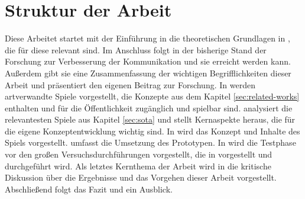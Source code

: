 \section{Struktur der Arbeit}
Diese Arbeitet startet mit der Einführung in die theoretischen Grundlagen in , die für diese relevant sind. Im Anschluss folgt in  der bisherige Stand der Forschung zur Verbesserung der Kommunikation und sie erreicht werden kann. Außerdem gibt sie eine Zusammenfassung der wichtigen Begrifflichkeiten dieser Arbeit und präsentiert den eigenen Beitrag zur Forschung. In  werden artverwandte Spiele vorgestellt, die Konzepte aus dem Kapitel \ref{sec:related-works} enthalten und für die Öffentlichkeit zugänglich und spielbar sind.  analysiert die relevantesten Spiele aus Kapitel \ref{sec:sota} und stellt Kernaspekte heraus, die für die eigene Konzeptentwicklung wichtig sind. In  wird das Konzept und Inhalte des Spiels vorgestellt.  umfasst die Umsetzung des Prototypen. In  wird die Testphase vor den großen Versuchsdurchführungen vorgestellt, die in  vorgestellt und durchgeführt wird. Als letztes Kernthema der Arbeit wird in  die kritische Diskussion über die Ergebnisse und das Vorgehen dieser Arbeit vorgestellt. Abschließend folgt das Fazit und ein Ausblick.

